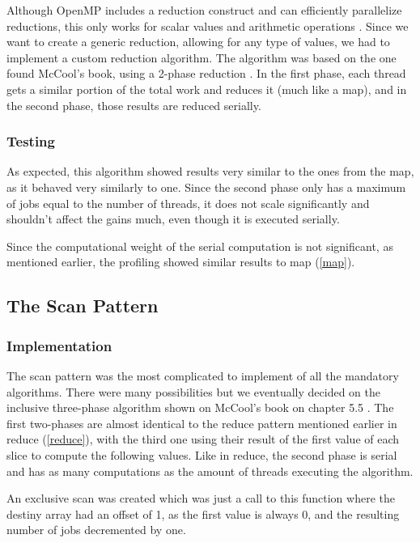 \documentclass[9pt,journal]{IEEEtran}
\begin{document}
Although OpenMP includes a reduction construct and can efficiently parallelize reductions, this only works for scalar values and arithmetic operations \cite{ompreduct}. Since we want to create a generic reduction, allowing for any type of values, we had to implement a custom reduction algorithm. The algorithm was based on the one found McCool's book, using a 2-phase reduction \cite{mccool}. In the first phase, each thread gets a similar portion of the total work and reduces it (much like a map), and in the second phase, those results are reduced serially. 

\subsubsection{Testing}

As expected, this algorithm showed results very similar to the ones from the map, as it behaved very similarly to one. Since the second phase only has a maximum of jobs equal to the number of threads, it does not scale significantly and shouldn't affect the gains much, even though it is executed serially.

Since the computational weight of the serial computation is not significant, as mentioned earlier, the profiling showed similar results to map (\ref{map}).

\subsection{The Scan Pattern}
\subsubsection{Implementation}

The scan pattern was the most complicated to implement of all the mandatory algorithms. There were many possibilities but we eventually decided on the inclusive three-phase algorithm shown on McCool's book on chapter 5.5 \cite{mccool}. The first two-phases are almost identical to the reduce pattern mentioned earlier in reduce (\ref{reduce}), with the third one using their result of the first value of each slice to compute the following values. Like in reduce, the second phase is serial and has as many computations as the amount of threads executing the algorithm. 

An exclusive scan was created which was just a call to this function where the destiny array had an offset of 1, as the first value is always 0, and the resulting number of jobs decremented by one.
\end{document}
